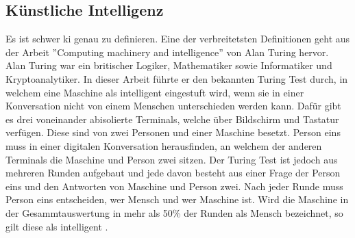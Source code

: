 \documentclass[12pt,a4paper]{article}
\begin{document}
	\subsection{Künstliche Intelligenz}
		Es ist schwer \ac{ki} genau zu definieren.
		Eine der verbreitetsten Definitionen geht aus der Arbeit ''Computing machinery and intelligence'' von Alan Turing hervor.
		Alan Turing war ein britischer Logiker, Mathematiker sowie Informatiker und Kryptoanalytiker. 
		In dieser Arbeit führte er den bekannten Turing Test durch, in welchem eine Maschine als intelligent eingestuft wird, wenn sie in einer Konversation nicht von einem Menschen unterschieden werden kann.
		Dafür gibt es drei voneinander abisolierte Terminals, welche über Bildschirm und Tastatur verfügen.
		Diese sind von zwei Personen und einer Maschine besetzt.
		Person eins muss in einer digitalen Konversation herausfinden, an welchem der anderen Terminals die Maschine und Person zwei sitzen.
		Der Turing Test ist jedoch aus mehreren Runden aufgebaut und jede davon besteht aus einer Frage der Person eins und den Antworten von Maschine und Person zwei.
		Nach jeder Runde muss Person eins entscheiden, wer Mensch und wer Maschine ist.
		Wird die Maschine in der Gesammtauswertung in mehr als 50\% der Runden als Mensch bezeichnet, so gilt diese als intelligent \cite[\ac{vgl}][]{10.1111/bjd.18880}.
\end{document}
